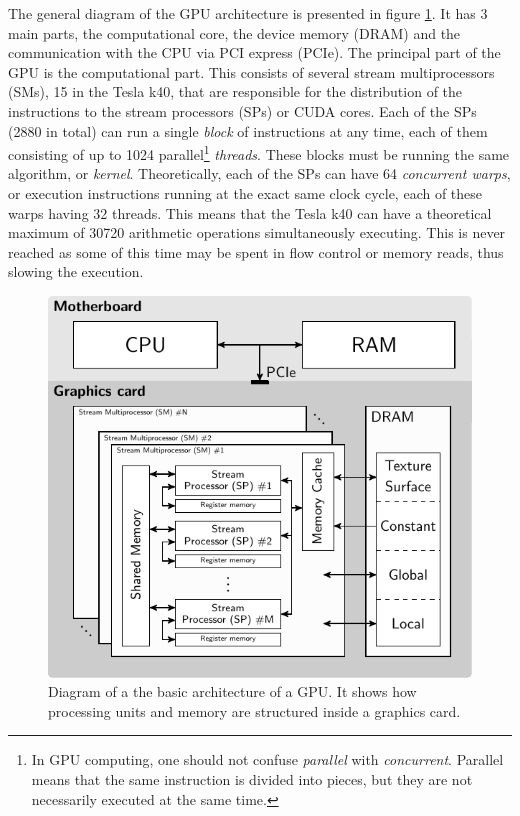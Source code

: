 The general diagram of the GPU architecture is presented in figure \ref{fig:GPUarch}. It has 3 main parts, the computational core, the device memory (DRAM) and the communication with the CPU via PCI express (PCIe).
The principal part of the GPU is the computational part. This consists of several stream multiprocessors (SMs), 15 in the Tesla k40, that are responsible for the distribution of the instructions to the stream processors (SPs) or CUDA cores. Each of the SPs (2880 in total) can run a single \textit{block} of instructions at any time, each of them consisting of up to 1024 parallel\footnote{In GPU computing, one should not confuse \textit{parallel} with \textit{concurrent}. Parallel means that the same instruction is divided into pieces, but they are not necessarily executed at the same time.} \textit{threads}. These blocks must be running the same algorithm, or \textit{kernel}. Theoretically, each of the SPs can have 64 \textit{concurrent warps}, or execution instructions running at the exact same clock cycle, each of these warps having 32 threads. This means that the Tesla k40 can have a theoretical maximum of 30720 arithmetic operations simultaneously executing. This is never reached as some of this time may be spent in flow control or memory reads, thus slowing the execution. 

\begin{figure}
\begin{center}

\includegraphics[width=\textwidth]{GPUmethods/architecture-figure0.pdf} 
\end{center}

\caption[Block diagram of a GPU architecture]{\label{fig:GPUarch} Diagram of a the basic architecture of a GPU. It shows how processing units and memory are structured inside a graphics card.} 
\end{figure}




